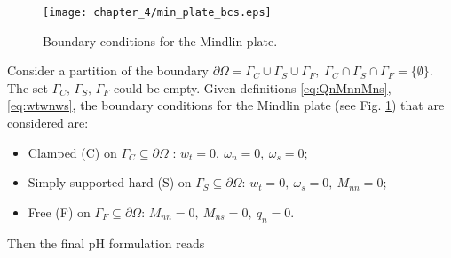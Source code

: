 \begin{figure}[tb]
	\centering
	\texttt{[image: chapter\_4/min\_plate\_bcs.eps]}
	\caption{Boundary conditions for the Mindlin plate.}
	\label{fig:bcs_min}
\end{figure}
Consider a partition of the boundary $\partial \Omega  = {\Gamma}_{C} \cup {\Gamma}_{S} \cup {\Gamma}_{F}, \; {\Gamma}_{C} \cap {\Gamma}_{S} \cap {\Gamma}_{F} = \{\emptyset\}$. The set $\Gamma_{C}, \, \Gamma_{S}, \, \Gamma_{F}$ could be empty. Given definitions \eqref{eq:QnMnnMns}, \eqref{eq:wtwnws}, the boundary conditions for the Mindlin plate \cite{duran1999approximation} (see Fig. \ref{fig:bcs_min}) that are considered are:
\begin{itemize}
\item Clamped (C) on $\Gamma_{C}\subseteq \partial \Omega$ : $w_t = 0, \ \omega_{n} = 0, \ \omega_{s}=0$;
\item Simply supported hard (S) on $\Gamma_{S}\subseteq \partial \Omega$: $w_t = 0, \ \omega_{s}=0, \ M_{nn} = 0$;
\item Free (F) on $\Gamma_{F}\subseteq \partial \Omega$: $M_{nn}=0, \ M_{ns} = 0, \ q_n = 0$.
\end{itemize}
Then the final pH formulation reads

